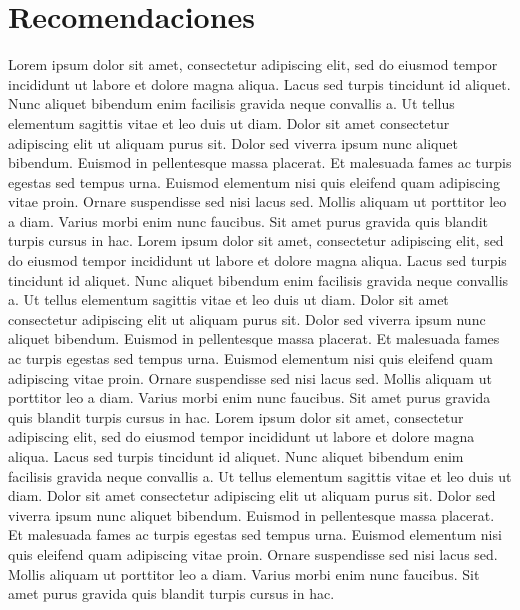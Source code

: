 
\pagestyle{myportland}
\doublespacing
\chapter*{\centering \large Recomendaciones}
\thispagestyle{myportland}


Lorem ipsum dolor sit amet, consectetur adipiscing elit, sed do eiusmod tempor incididunt ut labore et dolore magna aliqua. Lacus sed turpis tincidunt id aliquet. Nunc aliquet bibendum enim facilisis gravida neque convallis a. Ut tellus elementum sagittis vitae et leo duis ut diam. Dolor sit amet consectetur adipiscing elit ut aliquam purus sit. Dolor sed viverra ipsum nunc aliquet bibendum. Euismod in pellentesque massa placerat. Et malesuada fames ac turpis egestas sed tempus urna. Euismod elementum nisi quis eleifend quam adipiscing vitae proin. Ornare suspendisse sed nisi lacus sed. Mollis aliquam ut porttitor leo a diam. Varius morbi enim nunc faucibus. Sit amet purus gravida quis blandit turpis cursus in hac. Lorem ipsum dolor sit amet, consectetur adipiscing elit, sed do eiusmod tempor incididunt ut labore et dolore magna aliqua. Lacus sed turpis tincidunt id aliquet. Nunc aliquet bibendum enim facilisis gravida neque convallis a. Ut tellus elementum sagittis vitae et leo duis ut diam. Dolor sit amet consectetur adipiscing elit ut aliquam purus sit. Dolor sed viverra ipsum nunc aliquet bibendum. Euismod in pellentesque massa placerat. Et malesuada fames ac turpis egestas sed tempus urna. Euismod elementum nisi quis eleifend quam adipiscing vitae proin. Ornare suspendisse sed nisi lacus sed. Mollis aliquam ut porttitor leo a diam. Varius morbi enim nunc faucibus. Sit amet purus gravida quis blandit turpis cursus in hac. Lorem ipsum dolor sit amet, consectetur adipiscing elit, sed do eiusmod tempor incididunt ut labore et dolore magna aliqua. Lacus sed turpis tincidunt id aliquet. Nunc aliquet bibendum enim facilisis gravida neque convallis a. Ut tellus elementum sagittis vitae et leo duis ut diam. Dolor sit amet consectetur adipiscing elit ut aliquam purus sit. Dolor sed viverra ipsum nunc aliquet bibendum. Euismod in pellentesque massa placerat. Et malesuada fames ac turpis egestas sed tempus urna. Euismod elementum nisi quis eleifend quam adipiscing vitae proin. Ornare suspendisse sed nisi lacus sed. Mollis aliquam ut porttitor leo a diam. Varius morbi enim nunc faucibus. Sit amet purus gravida quis blandit turpis cursus in hac.


